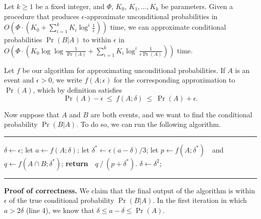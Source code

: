 \begin{subappendices}
\begin{lemma} \label{lem:logeps-conditioner}
    Let $k \ge 1$ be a fixed integer, and $\Phi$, $K_0$, $K_1, \ldots, K_k$ be parameters. 
     Given a procedure that
    produces $\epsilon$-approximate unconditional probabilities in 
    $O(\Phi \cdot (K_0 +  \sum_{i=1}^k K_i \log^i \frac1\epsilon) )$ time, 
    we can approximate conditional probabilities $\Pr(B|A)$ to within $\epsilon$ in 
    $
    O(\Phi  \cdot (K_0 \log \log \frac1{\Pr(A)} + \sum_{i=1}^k K_i \log^i \frac1{\epsilon \Pr(A)} ))
    $ 
    time.
\end{lemma}
\begin{lproof}
    Let $f$ be our algorithm for approximating unconditional probabilities.
    If $A$ is an event and $\epsilon > 0$, we write $f(A ; \epsilon)$
    for the corresponding approximation to $\Pr(A)$, which by definition satisfies
    \[
        \Pr(A) - \epsilon ~\le~ f(A; \delta) ~\le~ \Pr(A) + \epsilon.
    \]
    
    Now suppose that $A$ and $B$ are both events, and
    we want to find the conditional probability 
    $\Pr(B|A)$.
    To do so, we can run the following algorithm.     
    
    {\singlespacingplus
    \rule{4in}{0.2ex}
    \begin{algorithmic}[1]
        \STATE $\delta \gets \epsilon$;
        \LOOP
            \STATE let $a \gets f(A; \delta)$;
            \smallskip
                \STATE let $\delta^* \gets \epsilon (a - \delta) /3$;
                \STATE let $p \gets f(A ; \delta^*)$~~and~~ $q \gets f(A \cap B ; \delta^*)$;
                \STATE \textbf{return}~~$q ~/~ (p + \delta^*)$.
            \ELSE
                \STATE $\delta \gets \delta^2$;
            \ENDIF
        \ENDLOOP

    \end{algorithmic}
    \rule{4in}{0.2ex}%
    }
    
    \textbf{Proof of correctness.}
    We claim that the final output of the algorithm is within $\epsilon$ of the true conditional probability $\Pr(B|A)$.
    In the first iteration in which $a > 2\delta$ (line 4),
    we know that $\delta \le a - \delta \le \Pr(A)$.


\end{lproof}
\end{subappendices}
